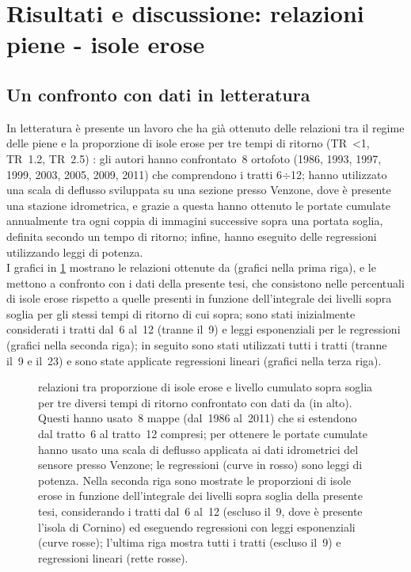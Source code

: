 \section[Risultati e discussione: relazioni piene - isole erose]{Risultati e discussione: relazioni\\piene - isole erose}
\subsection{Un confronto con dati in letteratura}
In letteratura è presente un lavoro che ha già ottenuto delle relazioni tra il regime delle piene e la proporzione di isole erose per tre tempi di ritorno (TR~\SI{<1}{\anno}, TR~\SI{1.2}{\anni}, TR~\SI{2.5}{\anni}) :
gli autori hanno confrontato~8 ortofoto (1986, 1993, 1997, 1999, 2003, 2005, 2009, 2011) che comprendono i tratti 6$\div$12;
hanno utilizzato una scala di deflusso sviluppata su una sezione presso Venzone, dove è presente una stazione idrometrica, e grazie a questa hanno ottenuto le portate cumulate annualmente tra ogni coppia di immagini successive sopra una portata soglia, definita secondo un tempo di ritorno;
infine, hanno eseguito delle regressioni utilizzando leggi di potenza.
\\
I grafici in \cref{graph:relazioni-piene-erosione-vs-surian} mostrano le relazioni ottenute da  (grafici nella prima riga), e le mettono a confronto con i dati della presente tesi, che consistono nelle percentuali di isole erose rispetto a quelle presenti in funzione dell'integrale dei livelli sopra soglia per gli stessi tempi di ritorno di cui sopra; sono stati inizialmente considerati i tratti dal~6 al~12 (tranne il~9) e leggi esponenziali per le regressioni (grafici nella seconda riga); in seguito sono stati utilizzati tutti i tratti (tranne il~9 e il~23) e sono state applicate regressioni lineari (grafici nella terza riga).
%
\begin{figure}
	\centering
	
	\caption[relazioni tra proporzione di isole erose e livello cumulato sopra soglia, confrontato con dati da ]{relazioni tra proporzione di isole erose e livello cumulato sopra soglia per tre diversi tempi di ritorno confrontato con dati da  (in alto).
	Questi hanno usato~8 mappe (dal~1986 al~2011) che si estendono dal tratto~6 al tratto~12 compresi; per ottenere le portate cumulate hanno usato una scala di deflusso applicata ai dati idrometrici del sensore presso Venzone; le regressioni (curve in rosso) sono leggi di potenza.
	Nella seconda riga sono mostrate le proporzioni di isole erose in funzione dell'integrale dei livelli sopra soglia della presente tesi, considerando i tratti dal~6 al~12 (escluso il~9, dove è presente l'isola di Cornino) ed eseguendo regressioni con leggi esponenziali (curve rosse); l'ultima riga mostra tutti i tratti (escluso il~9) e regressioni lineari (rette rosse).}
	\label{graph:relazioni-piene-erosione-vs-surian}
\end{figure}
